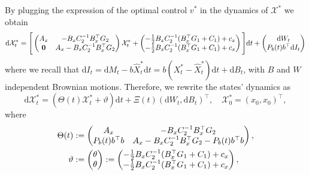\documentclass[a4paper,10pt]{article}
\newcommand{\D}{\mathrm{d}}
\newcommand{\Xx}{\mathcal{X}}
\theoremstyle{definition}
\theoremstyle{plain}
\numberwithin{equation}{section}
\begin{document}
By plugging the expression of the optimal control $v^*$ in the dynamics of $\mathcal X^*$ we obtain
\begin{align}
    \D \Xx^*_t
    = \Bigg[ 
    \begin{pmatrix}
        A_{\rm x} & - B_{\rm x} C_2 ^{-1} B_{\rm x} ^\top G_2\\
        \bold{0} & A_{\rm x} -  B_{\rm x} C_2 ^{-1} B_{\rm x} ^\top G_2
    \end{pmatrix}
    \Xx^*_t +
    \begin{pmatrix}
        -\frac{1}{2} B_{\rm x} C_2 ^{-1} (B_{\rm x} ^\top G_1 + C_1) + c_{\rm x}\\
        -\frac{1}{2} B_{\rm x} C_2 ^{-1} (B_{\rm x} ^\top G_1 + C_1) + c_{\rm x} 
    \end{pmatrix}
    \Bigg] \D t +
    \begin{pmatrix}
        \D W _t\\
        P_b(t)b^\top \D I_t 
    \end{pmatrix}
\end{align}
where we recall that $\D I_t = \D M_t - b\widehat{X}^* _t \D t = b(X^*_t - \widehat{X}_t^*)\D t + \D B_t$, with $B$ and $W$ independent Brownian motions. Therefore, we rewrite the states' dynamics as 
\begin{equation}
    \D \Xx^*_t
    = \left( \Theta(t)
    \Xx^*_t +
   \vartheta
    \right) \D t +
\Xi(t)  (
        \D W_t ,
       \D B_t )^\top , \quad \mathcal X^* _0 =(x_0,x_0) ^\top,
\end{equation}
where
\begin{align*}  \Theta(t) & :=
\begin{pmatrix}
        A_{\rm x} & - B_{\rm x} C_2^{-1} B_{\rm x} ^\top G_2\\
        P_b(t) b^\top b & A_{\rm x} - B_{\rm x} C_2^{-1} B_{\rm x} ^\top G_2 - 
            P_b(t)b^\top b
    \end{pmatrix},\\
     \vartheta & := \begin{pmatrix}
     \theta\\
     \theta
     \end{pmatrix}
     :=
    \begin{pmatrix}
        -\frac{1}{2} B_{\rm x} C_2^{-1} (B_{\rm x} ^\top G_1 +C_1) +c_{\rm x}\\
        -\frac{1}{2} B_{\rm x} C_2^{-1} (B_{\rm x} ^\top G_1 +C_1) +c_{\rm x}
    \end{pmatrix},
    \end{align*}
\end{document}
